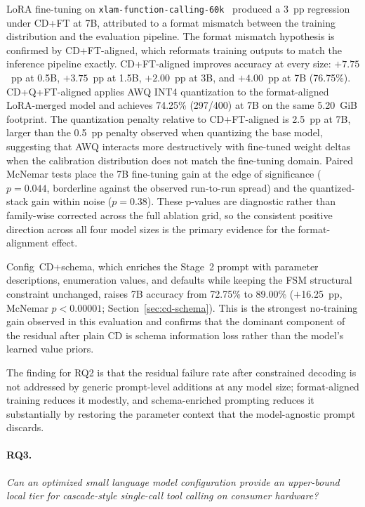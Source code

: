LoRA fine-tuning on
\texttt{xlam-function-calling-60k}~\cite{zhang2024xlam}
produced a 3~pp regression under CD+FT at 7B, attributed to a
format mismatch between the training distribution and the evaluation
pipeline.
The format mismatch hypothesis is confirmed by CD+FT-aligned, which
reformats training outputs to match the inference pipeline exactly.
CD+FT-aligned improves accuracy at every size: $+7.75$~pp at 0.5B,
$+3.75$~pp at 1.5B, $+2.00$~pp at 3B, and $+4.00$~pp at 7B
(76.75\%).
CD+Q+FT-aligned applies AWQ INT4 quantization to the format-aligned
LoRA-merged model and achieves 74.25\% (297/400) at 7B on the same
5.20~GiB footprint.
The quantization penalty relative to CD+FT-aligned is 2.5~pp at
7B, larger than the 0.5~pp penalty observed when quantizing the
base model, suggesting that AWQ interacts more destructively with
fine-tuned weight deltas when the calibration distribution does not
match the fine-tuning domain.
Paired McNemar tests place the 7B fine-tuning gain at the edge of
significance ($p = 0.044$, borderline against the observed
run-to-run spread) and the quantized-stack gain within noise
($p = 0.38$). These p-values are diagnostic rather than family-wise corrected
across the full ablation grid, so the consistent positive direction across all
four model sizes is the primary evidence for the format-alignment effect.

Config~CD+schema, which enriches the Stage~2 prompt with parameter
descriptions, enumeration values, and defaults while keeping the
FSM structural constraint unchanged, raises 7B accuracy from
72.75\% to 89.00\% ($+$16.25~pp, McNemar $p < 0.00001$;
Section~\ref{sec:cd-schema}).
This is the strongest no-training gain observed in this evaluation
and confirms that the dominant component of the residual after plain
CD is schema information loss rather than the model's learned value
priors.

The finding for RQ2 is that the residual failure rate after
constrained decoding is not addressed by generic prompt-level
additions at any model size; format-aligned training reduces it
modestly, and schema-enriched prompting reduces it substantially by
restoring the parameter context that the model-agnostic prompt
discards.

\paragraph{RQ3.} \textit{Can an optimized small language model configuration
provide an upper-bound local tier for cascade-style single-call tool calling on
consumer hardware?}

